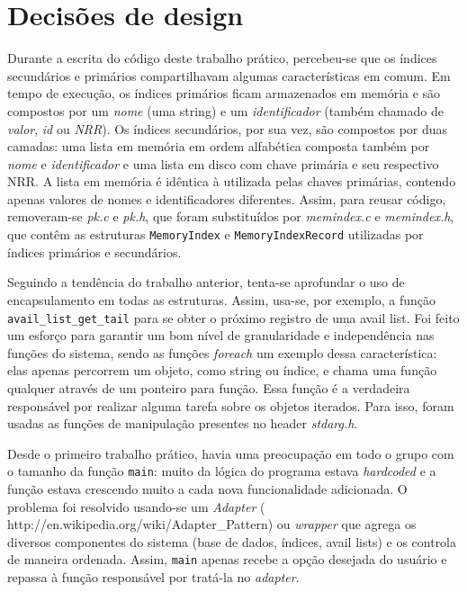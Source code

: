 \documentclass[a4paper,10pt]{article}
\begin{document}
\section{Decisões de design}
Durante a escrita do código deste trabalho prático, percebeu-se que os índices secundários e primários compartilhavam algumas características em comum. Em tempo de execução, os índices primários ficam armazenados em memória e são compostos por um \textit{nome} (uma string) e um \textit{identificador} (também chamado de \textit{valor}, \textit{id} ou \textit{NRR}). Os índices secundários, por sua vez, são compostos por duas camadas: uma lista em memória em ordem alfabética composta também por \textit{nome} e \textit{identificador} e uma lista em disco com chave primária e seu respectivo NRR. A lista em memória é idêntica à utilizada pelas chaves primárias, contendo apenas valores de nomes e identificadores diferentes. Assim, para reusar código, removeram-se \textit{pk.c} e \textit{pk.h}, que foram substituídos por \textit{memindex.c} e \textit{memindex.h}, que contêm as estruturas \texttt{MemoryIndex} e \texttt{MemoryIndexRecord} utilizadas por índices primários e secundários.

Seguindo a tendência do trabalho anterior, tenta-se aprofundar o uso de encapsulamento em todas as estruturas. Assim, usa-se, por exemplo, a função \texttt{avail\_list\_get\_tail} para se obter o próximo registro de uma avail list. Foi feito um esforço para garantir um bom nível de granularidade e independência nas funções do sistema, sendo as funções \textit{foreach} um exemplo dessa característica: elas apenas percorrem um objeto, como string ou índice, e chama uma função qualquer através de um ponteiro para função. Essa função é a verdadeira responsável por realizar alguma tarefa sobre os objetos iterados. Para isso, foram usadas as funções de manipulação presentes no header \textit{stdarg.h}.

Desde o primeiro trabalho prático, havia uma preocupação em todo o grupo com o tamanho da função \texttt{main}: muito da lógica do programa estava \textit{hardcoded} e a função estava crescendo muito a cada nova funcionalidade adicionada. O problema foi resolvido usando-se um \textit{Adapter} (        http://en.wikipedia.org/wiki/Adapter\_Pattern) ou \textit{wrapper} que agrega os diversos componentes do sistema (base de dados, índices, avail lists) e os controla de maneira ordenada. Assim, \texttt{main} apenas recebe a opção desejada do usuário e repassa à função responsável por tratá-la no \textit{adapter}.
\end{document}
